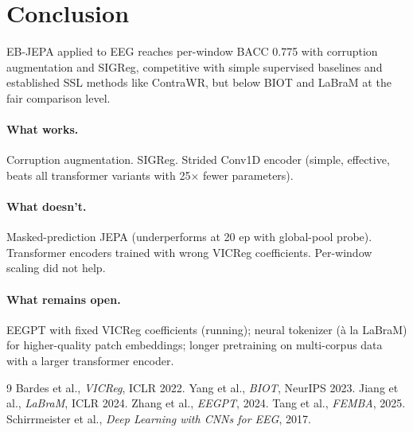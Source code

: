 \documentclass[10pt,a4paper]{article}
\begin{document}
\section{Conclusion}
EB-JEPA applied to EEG reaches per-window BACC 0.775 with corruption augmentation and SIGReg,
competitive with simple supervised baselines and established SSL methods like ContraWR,
but below BIOT and LaBraM at the fair comparison level.

\paragraph{What works.} Corruption augmentation. SIGReg. Strided Conv1D encoder (simple,
effective, beats all transformer variants with 25$\times$ fewer parameters).

\paragraph{What doesn't.} Masked-prediction JEPA (underperforms at 20 ep with global-pool probe).
Transformer encoders trained with wrong VICReg coefficients. Per-window scaling did not help.

\paragraph{What remains open.} EEGPT with fixed VICReg coefficients (running); neural tokenizer
(à la LaBraM) for higher-quality patch embeddings; longer pretraining on multi-corpus data with
a larger transformer encoder.

%
%
\begin{thebibliography}{9}
 Bardes et al., \emph{VICReg}, ICLR 2022.
 Yang et al., \emph{BIOT}, NeurIPS 2023.
 Jiang et al., \emph{LaBraM}, ICLR 2024.
 Zhang et al., \emph{EEGPT}, 2024.
 Tang et al., \emph{FEMBA}, 2025.
 Schirrmeister et al., \emph{Deep Learning with CNNs for EEG}, 2017.
\end{thebibliography}
\end{document}
